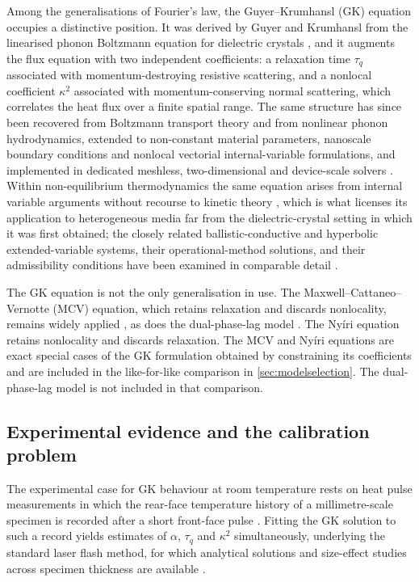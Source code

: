 \documentclass[preprint,12pt,a4paper]{elsarticle}
\theoremstyle{plain}
\theoremstyle{definition}
\theoremstyle{remark}
\newcommand{\tq}{\tau_{q}}
\newcommand{\kk}{\kappa^{2}}
\begin{document}
Among the generalisations of Fourier's law, the Guyer--Krumhansl (GK)
equation occupies a distinctive position. It was derived by Guyer and
Krumhansl from the linearised phonon Boltzmann equation for dielectric
crystals \cite{GuyerKrumhansl1966a,GuyerKrumhansl1966b}, and it augments the
flux equation with two independent coefficients: a relaxation time $\tq$
associated with momentum-destroying resistive scattering, and a nonlocal
coefficient $\kk$ associated with momentum-conserving normal scattering,
which correlates the heat flux over a finite spatial range. The same
structure has since been recovered from Boltzmann transport theory and from
nonlinear phonon hydrodynamics, extended to non-constant material
parameters, nanoscale boundary conditions and nonlocal vectorial
internal-variable formulations, and implemented in dedicated meshless,
two-dimensional and device-scale solvers
\cite{Xu2024,DiDomenico2025,Restuccia2023,Kovacs2026}.
Within non-equilibrium thermodynamics the same equation arises from internal
variable arguments without recourse to kinetic theory
\cite{Van2001,Szucs2021}, which is what licenses its application to
heterogeneous media far from the dielectric-crystal setting in which it was
first obtained; the closely related ballistic-conductive and hyperbolic
extended-variable systems, their operational-method solutions, and their
admissibility conditions have been examined in comparable detail
\cite{Rukolaine2024,Zhukovsky2016a,Zhukovsky2016}.

The GK equation is not the only generalisation in use. The
Maxwell--Cattaneo--Vernotte (MCV) equation, which retains relaxation and
discards nonlocality, remains widely applied \cite{Maillet2019,Kovacs2020},
as does the dual-phase-lag model \cite{vanderMerwe2021}. The Nyíri equation
\cite{Nyiri1991} retains nonlocality and discards relaxation. The MCV and
Nyíri equations are exact special cases of the GK formulation obtained by
constraining its coefficients and are included in the like-for-like
comparison in \cref{sec:modelselection}. The dual-phase-lag model is not
included in that comparison.

\subsection{Experimental evidence and the calibration problem}

The experimental case for GK behaviour at room temperature rests on heat
pulse measurements in which the rear-face temperature history of a
millimetre-scale specimen is recorded after a short front-face pulse
\cite{Both2016,Van2017,Feher2021sizeeffects}. Fitting the GK solution to such
a record yields estimates of $\alpha$, $\tq$ and $\kk$ simultaneously,
underlying the standard laser flash method, for which analytical solutions
and size-effect studies across specimen thickness are available
\cite{Kovacs2018,Feher2021sizeeffects,FeherKovacs2021}.
\end{document}
